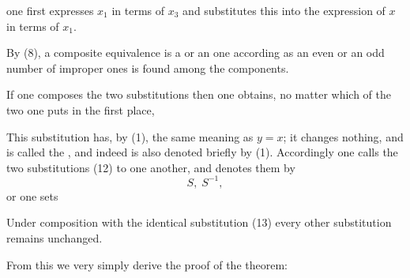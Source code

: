 one first expresses $x_1$ in terms of $x_3$ and substitutes this into the expression of $x$ in terms of $x_1$.

By (8), a composite equivalence is a  or an  one according as an even or an odd number of improper ones is found among the components.

If one composes the two substitutions
then one obtains, no matter which of the two one puts in the first place,

This substitution has, by (1), the same meaning as $y = x$; it changes nothing, and is called the , and indeed is also denoted briefly by (1). Accordingly one calls the two substitutions (12)  to one another, and denotes them by
\[
S, \; S^{-1},
\]
or one sets

Under composition with the identical substitution (13) every other substitution remains unchanged.

From this we very simply derive the proof of the theorem:


